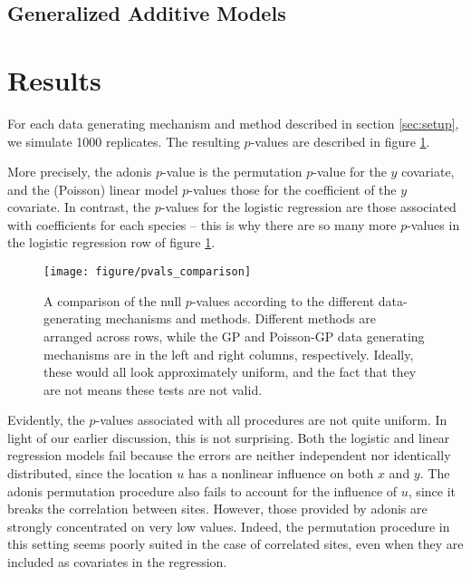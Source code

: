\documentclass{article}
\begin{document}
\subsection{Generalized Additive Models}
\label{subsec:generalized_additive_models}



\section{Results}
\label{sec:results}

For each data generating mechanism and method described in section
\ref{sec:setup}, we simulate 1000 replicates. The resulting $p$-values are
described in figure \ref{fig:pvals_comparison}.

More precisely, the adonis $p$-value is the permutation $p$-value for the $y$
covariate, and the (Poisson) linear model $p$-values those for the coefficient
of the $y$ covariate. In contrast, the $p$-values for the logistic regression
are those associated with coefficients for each species -- this is why there are
so many more $p$-values in the logistic regression row of figure
\ref{fig:pvals_comparison}.

\begin{figure}
  \centering
  \texttt{[image: figure/pvals\_comparison]}
  \caption{\label{fig:pvals_comparison} A comparison of the null $p$-values
    according to the different data-generating mechanisms and methods. Different
    methods are arranged across rows, while the GP and Poisson-GP data
    generating mechanisms are in the left and right columns, respectively.
    Ideally, these would all look approximately uniform, and the fact that they
    are not means these tests are not valid.}
\end{figure}

Evidently, the $p$-values associated with all procedures are not quite uniform.
In light of our earlier discussion, this is not surprising. Both the logistic
and linear regression models fail because the errors are neither independent nor
identically distributed, since the location $u$ has a nonlinear influence on
both $x$ and $y$. The adonis permutation procedure also fails to account for the
influence of $u$, since it breaks the correlation between sites. However, those
provided by adonis are strongly concentrated on very low values. Indeed, the
permutation procedure in this setting seems poorly suited in the case of
correlated sites, even when they are included as covariates in the regression.



\end{document}
